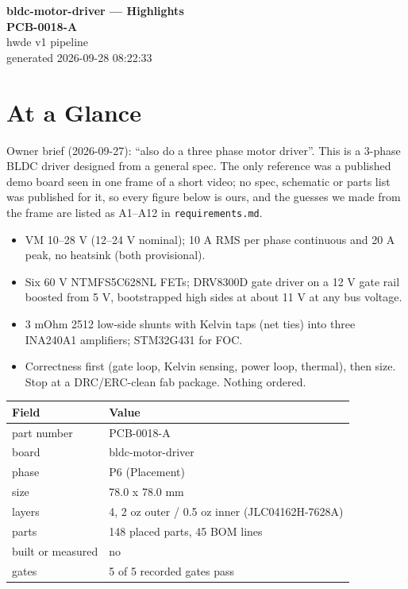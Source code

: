\documentclass[11pt,a4paper]{article}
\begin{document}
\sloppy
\begin{center}
{\LARGE\bfseries bldc-motor-driver --- Highlights}\\[6pt]
{\Large\bfseries PCB-0018-A}\\[6pt]
{\large hwde v1 pipeline}\\[2pt]
generated 2026-09-28 08:22:33
\end{center}


\section{At a Glance}
Owner brief (2026-09-27): ``also do a three phase motor driver''. This is a 3-phase BLDC driver designed from a general spec. The only reference was a published demo board seen in one frame of a short video; no spec, schematic or parts list was published for it, so every figure below is ours, and the guesses we made from the frame are listed as A1--A12 in \texttt{requirements.md}.

\begin{itemize}
\item VM 10--28 V (12--24 V nominal); 10 A RMS per phase continuous and 20 A peak, no heatsink (both provisional).
\item Six 60 V NTMFS5C628NL FETs; DRV8300D gate driver on a 12 V gate rail boosted from 5 V, bootstrapped high sides at about 11 V at any bus voltage.
\item 3 mOhm 2512 low-side shunts with Kelvin taps (net ties) into three INA240A1 amplifiers; STM32G431 for FOC.
\item Correctness first (gate loop, Kelvin sensing, power loop, thermal), then size. Stop at a DRC/ERC-clean fab package. Nothing ordered.
\end{itemize}

{\small
\begin{longtable}{lp{11cm}}
\toprule
\textbf{Field} & \textbf{Value} \\
\midrule
\endhead
part number & PCB-0018-A \\
board & bldc-motor-driver \\
phase & P6 (Placement) \\
size & 78.0 x 78.0 mm \\
layers & 4, 2 oz outer / 0.5 oz inner (JLC04162H-7628A) \\
parts & 148 placed parts, 45 BOM lines \\
built or measured & no \\
gates & 5 of 5 recorded gates pass \\
\bottomrule
\end{longtable}
}
\end{document}
